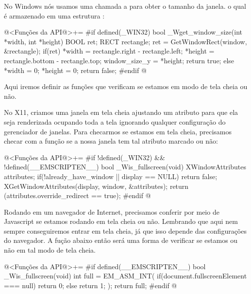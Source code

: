 
No Windows nós usamos uma chamada a  para
obter o tamanho da janela. o qual é armazenado em uma
estrutura :

\iniciocodigo
@<Funções da API@>+=
#if defined(_WIN32)
bool _Wget_window_size(int *width, int *height){
  BOOL ret;
  RECT rectangle;
  ret = GetWindowRect(window, &rectangle);
  if(ret){
    *width = rectangle.right - rectangle.left;
    *height = rectangle.bottom - rectangle.top;
    window_size_y = *height;
    return true;
  }
  else{
    *width = 0;
    *height = 0;
    return false;
  }
}
#endif
@
\fimcodigo


Aqui iremos definir as funções que verificam se estamos em modo de
tela cheia ou não.


No X11, criamos uma janela em tela cheia ajustando um atributo para
que ela seja renderizada ocupando toda a tela ignorando qualquer
configuração do gerenciador de janelas. Para checarmos se estamos em
tela cheia, precisamos checar com a
função  se a nossa janela tem tal
atributo marcado ou não:

\iniciocodigo
@<Funções da API@>+=
#if !defined(_WIN32) && !defined(__EMSCRIPTEN__)
bool _Wis_fullscreen(void){
  XWindowAttributes attributes;
  if(!already_have_window || display == NULL)
    return false;
  XGetWindowAttributes(display, window, &attributes);
  return (attributes.override_redirect == true);
}
#endif
@


Rodando em um navegador de Internet, precisamos conferir por meio de
Javascript se estamos rodando em tela cheia ou não. Lembrando que aqui
nem sempre conseguiremos entrar em tela cheia, já que isso depende das
configurações do navegador. A fução abaixo então será uma forma de
verificar se estamos ou não em tal modo de tela cheia.

\iniciocodigo
@<Funções da API@>+=
#if defined(__EMSCRIPTEN__)
bool _Wis_fullscreen(void){
  int full = EM_ASM_INT({
    if(document.fullscreenElement === null){
      return 0;
    } else{
      return 1;
    }
  });
  return full;
}
#endif
@


